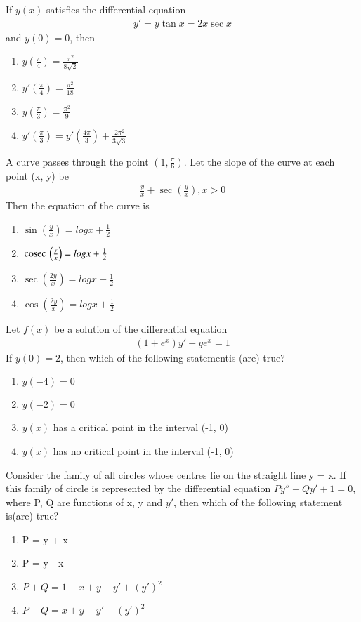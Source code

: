 \item If $y(x)$ satisfies the differential equation 
\begin{align*}
y' = y\tan x = 2x\sec x 
\end{align*}
and $y(0) = 0$, then
\begin{enumerate}
\item $y\left(\frac{\pi}{4}\right) = \frac{\pi^2}{8\sqrt{2}}$
\item $y'\left(\frac{\pi}{4}\right) = \frac{\pi^2}{18}$
\item $y\left(\frac{\pi}{3}\right) = \frac{\pi^2}{9}$
\item $y'\left(\frac{\pi}{3}\right) =  y'\left(\frac{4\pi}{3}\right)+ \frac{2\pi^2}{3\sqrt{3}}$
\end{enumerate}

\item A curve passes through the point $\left(1, \frac{\pi}{6}\right)$. Let the slope of the curve at each point (x, y) be
\begin{align*}
\frac{y}{x} + \sec\left(\frac{y}{x}\right), x > 0
\end{align*}
Then the equation of the curve is
\begin{enumerate}
\item $\sin\left(\frac{y}{x}\right) = log x + \frac{1}{2}$
\item $\,\text{cosec}\,\left(\frac{y}{x}\right) = log x + \frac{1}{2}$
\item $\sec\left(\frac{2y}{x}\right) = log x + \frac{1}{2}$
\item $\cos\left(\frac{2y}{x}\right) = log x + \frac{1}{2}$
\end{enumerate}

\item Let $f(x)$ be a solution of the differential equation
\begin{align*}
(1 + e^x)y' + ye^x = 1
\end{align*}
If $y(0) = 2$, then which of the following statementis (are) true?
\begin{enumerate}
\item $y(-4) = 0$
\item $y(-2) = 0$
\item $y(x)$ has a critical point in the interval (-1, 0)
\item $y(x)$ has no critical point in the interval (-1, 0)
\end{enumerate}

\item Consider the family of all circles whose centres lie on the straight line y = x. If this family of circle is represented by the differential equation $Py'' + Qy' + 1 = 0$, where P, Q are functions of x, y and $y'$, then which of the following statement is(are) true?
\begin{enumerate}
\item P = y + x
\item P = y - x
\item $P + Q = 1 - x + y + y' + (y')^{2}$
\item $P - Q = x + y - y' - (y')^{2}$
\end{enumerate}

